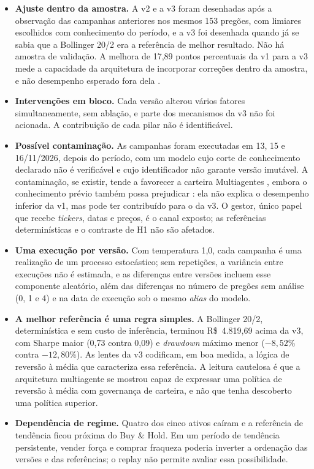 \begin{itemize}
    \item \textbf{Ajuste dentro da amostra.} A v2 e a v3 foram desenhadas após a observação das campanhas anteriores nos mesmos 153 pregões, com limiares escolhidos com conhecimento do período, e a v3 foi desenhada quando já se sabia que a Bollinger 20/2 era a referência de melhor resultado. Não há amostra de validação. A melhora de 17,89 pontos percentuais da v1 para a v3 mede a capacidade da arquitetura de incorporar correções dentro da amostra, e não desempenho esperado fora dela \citep{White2000, Bailey2017}.
    \item \textbf{Intervenções em bloco.} Cada versão alterou vários fatores simultaneamente, sem ablação, e parte dos mecanismos da v3 não foi acionada. A contribuição de cada pilar não é identificável.
    \item \textbf{Possível contaminação.} As campanhas foram executadas em 13, 15 e 16/11/2026, depois do período, com um modelo cujo corte de conhecimento declarado não é verificável e cujo identificador não garante versão imutável. A contaminação, se existir, tende a favorecer a carteira Multiagentes \citep{ProfitMirage2025, Wang2026}, embora o conhecimento prévio também possa prejudicar \citep{Glasserman2023}: ela não explica o desempenho inferior da v1, mas pode ter contribuído para o da v3. O gestor, único papel que recebe \textit{tickers}, datas e preços, é o canal exposto; as referências determinísticas e o contraste de H1 não são afetados.
    \item \textbf{Uma execução por versão.} Com temperatura 1,0, cada campanha é uma realização de um processo estocástico; sem repetições, a variância entre execuções não é estimada, e as diferenças entre versões incluem esse componente aleatório, além das diferenças no número de pregões sem análise (0, 1 e 4) e na data de execução sob o mesmo \textit{alias} do modelo.
    \item \textbf{A melhor referência é uma regra simples.} A Bollinger 20/2, determinística e sem custo de inferência, terminou R\$~4.819,69 acima da v3, com Sharpe maior (0,73 contra 0,09) e \textit{drawdown} máximo menor ($-8{,}52\%$ contra $-12{,}80\%$). As lentes da v3 codificam, em boa medida, a lógica de reversão à média que caracteriza essa referência. A leitura cautelosa é que a arquitetura multiagente se mostrou capaz de expressar uma política de reversão à média com governança de carteira, e não que tenha descoberto uma política superior.
    \item \textbf{Dependência de regime.} Quatro dos cinco ativos caíram e a referência de tendência ficou próxima do Buy \& Hold. Em um período de tendência persistente, vender força e comprar fraqueza poderia inverter a ordenação das versões e das referências; o replay não permite avaliar essa possibilidade.

\end{itemize}
